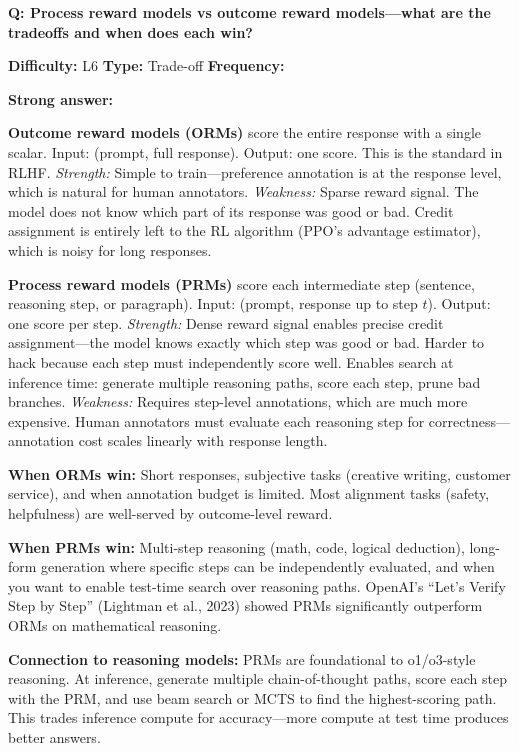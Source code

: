 \begin{interviewq}
\textbf{Q: Process reward models vs outcome reward models---what are the tradeoffs and when does each win?}

\textbf{Difficulty:} L6 \quad \textbf{Type:} Trade-off \quad \textbf{Frequency:} \freqmed{}

\textbf{Strong answer:}

\textbf{Outcome reward models (ORMs)} score the entire response with a single scalar. Input: (prompt, full response). Output: one score. This is the standard in RLHF. \textit{Strength:} Simple to train---preference annotation is at the response level, which is natural for human annotators. \textit{Weakness:} Sparse reward signal. The model does not know which part of its response was good or bad. Credit assignment is entirely left to the RL algorithm (PPO's advantage estimator), which is noisy for long responses.

\textbf{Process reward models (PRMs)} score each intermediate step (sentence, reasoning step, or paragraph). Input: (prompt, response up to step $t$). Output: one score per step. \textit{Strength:} Dense reward signal enables precise credit assignment---the model knows exactly which step was good or bad. Harder to hack because each step must independently score well. Enables search at inference time: generate multiple reasoning paths, score each step, prune bad branches. \textit{Weakness:} Requires step-level annotations, which are much more expensive. Human annotators must evaluate each reasoning step for correctness---annotation cost scales linearly with response length.

\textbf{When ORMs win:} Short responses, subjective tasks (creative writing, customer service), and when annotation budget is limited. Most alignment tasks (safety, helpfulness) are well-served by outcome-level reward.

\textbf{When PRMs win:} Multi-step reasoning (math, code, logical deduction), long-form generation where specific steps can be independently evaluated, and when you want to enable test-time search over reasoning paths. OpenAI's ``Let's Verify Step by Step'' (Lightman et al., 2023) showed PRMs significantly outperform ORMs on mathematical reasoning.

\textbf{Connection to reasoning models:} PRMs are foundational to o1/o3-style reasoning. At inference, generate multiple chain-of-thought paths, score each step with the PRM, and use beam search or MCTS to find the highest-scoring path. This trades inference compute for accuracy---more compute at test time produces better answers.


\end{interviewq}
